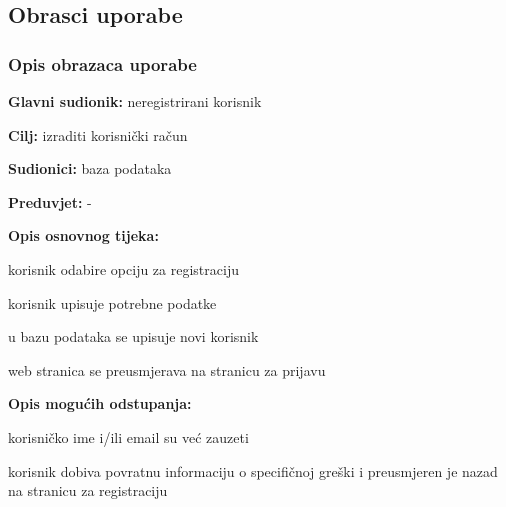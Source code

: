 			
				
			\subsection{Obrasci uporabe}
				
				\subsubsection{Opis obrazaca uporabe}
					
					\noindent {}
					\begin{packed_item}
						
						\item \textbf{Glavni sudionik: }neregistrirani korisnik
						\item  \textbf{Cilj:} izraditi korisnički račun
						\item  \textbf{Sudionici:} baza podataka
						\item  \textbf{Preduvjet:} -
						\item  \textbf{Opis osnovnog tijeka:}
						
						\item[] \begin{packed_enum}
							
							\item korisnik odabire opciju za registraciju
							\item korisnik upisuje potrebne podatke
							\item u bazu podataka se upisuje novi korisnik
							\item web stranica se preusmjerava na stranicu za prijavu 
					
						\end{packed_enum}
						
						\item  \textbf{Opis mogućih odstupanja:}
						
						\item[] \begin{packed_item}
							
							\item[2.a] korisničko ime i/ili email su već zauzeti
							\item[] \begin{packed_enum}
								
								\item korisnik dobiva povratnu informaciju o specifičnoj greški i preusmjeren je nazad na stranicu za              registraciju
								

\end{packed_enum}
\end{packed_item}
\end{packed_item}
